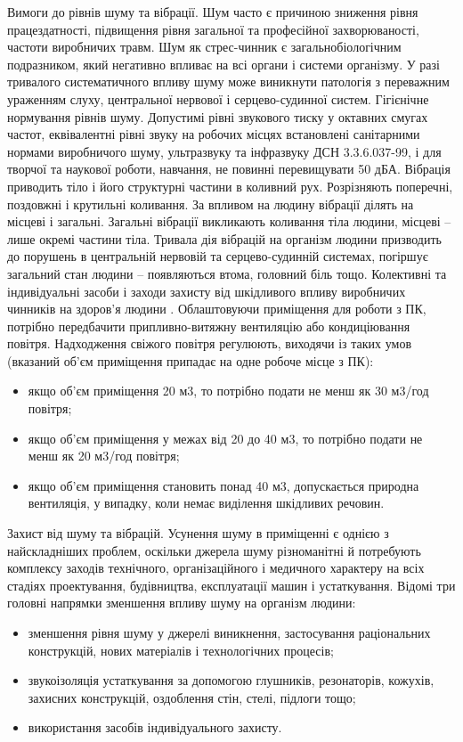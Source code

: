 \documentclass[12pt,a4paper]{article}
\begin{document}
Вимоги до рівнів шуму та вібрації. Шум часто є причиною зниження рівня працездатності, підвищення рівня загальної та професійної захворюваності, частоти виробничих травм. Шум як стрес-чинник є загальнобіологічним подразником, який негативно впливає на всі органи і системи організму. У разі тривалого систематичного впливу шуму може виникнути патологія з переважним ураженням слуху, центральної нервової і серцево-судинної систем.
Гігієнічне нормування рівнів шуму. Допустимі рівні звукового тиску у октавних смугах частот, еквівалентні рівні звуку на робочих місцях встановлені санітарними нормами виробничого шуму, ультразвуку та інфразвуку ДСН 3.3.6.037-99, і для творчої та наукової роботи, навчання, не повинні перевищувати 50 дБА. 
Вібрація приводить тіло і його структурні частини в коливний рух. Розрізняють поперечні, поздовжні і крутильні коливання. За впливом на людину вібрації ділять на місцеві і загальні. Загальні вібрації викликають коливання тіла людини, місцеві – лише окремі частини тіла. Тривала дія вібрацій на організм людини призводить до порушень в центральній нервовій та серцево-судинній системах, погіршує загальний стан людини – появляються втома, головний біль тощо.
Колективні  та індивідуальні засоби і заходи захисту від шкідливого впливу виробничих чинників на здоров’я людини .
Облаштовуючи приміщення для роботи з ПК, потрібно передбачити припливно-витяжну вентиляцію або кондиціювання повітря. Надходження свіжого повітря регулюють, виходячи із таких умов (вказаний об’єм приміщення припадає на одне робоче місце з ПК):
\begin{itemize}
\item	якщо об’єм приміщення 20 м3, то потрібно подати не менш як 30 м3/год повітря;
\item	якщо об’єм приміщення у межах від 20 до 40 м3, то потрібно подати не менш як 20 м3/год повітря;
\item	якщо об’єм приміщення становить понад 40 м3, допускається природна вентиляція, у випадку, коли немає виділення шкідливих речовин.
\end{itemize}
Захист від шуму та вібрацій. Усунення шуму в приміщенні є однією з найскладніших проблем, оскільки джерела шуму різноманітні й потребують комплексу заходів технічного, організаційного і медичного характеру на всіх стадіях проектування, будівництва, експлуатації машин і устаткування. Відомі три головні напрямки зменшення впливу шуму на організм людини:
\begin{itemize}
\item	зменшення рівня шуму у джерелі виникнення, застосування раціональних конструкцій, нових матеріалів і технологічних процесів;
\item	звукоізоляція устаткування за допомогою глушників, резонаторів, кожухів, захисних конструкцій, оздоблення стін, стелі, підлоги тощо;
\item	використання засобів індивідуального захисту.
\end{itemize}
\end{document}
